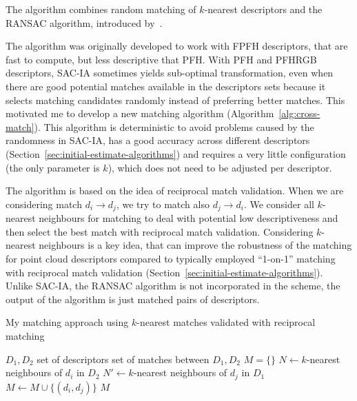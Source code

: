 The algorithm combines random matching of $k$-nearest descriptors and the \gls{RANSAC} algorithm, introduced by~\citet{fischler1981ransac}.

The algorithm was originally developed to work with \gls{FPFH} descriptors, that are fast to compute, but less descriptive that \gls{PFH}. With \gls{PFH} and \gls{PFHRGB} descriptors, \gls{SAC-IA} sometimes yields sub-optimal transformation, even when there are good potential matches available in the descriptors sets because it selects matching candidates randomly instead of preferring better matches. This motivated me to develop a new matching algorithm (Algorithm~\ref{alg:cross-match}). This algorithm is deterministic to avoid problems caused by the randomness in \gls{SAC-IA}, has a good accuracy across different descriptors (Section~\ref{sec:initial-estimate-algorithms}) and requires a very little configuration (the only parameter is $k$), which does not need to be adjusted per descriptor.

The algorithm is based on the idea of reciprocal match validation. When we are considering match $d_i \rightarrow d_j$, we try to match also $d_j \rightarrow d_i$. We consider all $k$-nearest neighbours for matching to deal with potential low descriptiveness and then select the best match with reciprocal match validation. Considering $k$-nearest neighbours is a key idea, that can improve the robustness of the matching for point cloud descriptors compared to typically employed ``1-on-1'' matching with reciprocal match validation (Section~\ref{sec:initial-estimate-algorithms}). Unlike \gls{SAC-IA}, the \gls{RANSAC} algorithm is not incorporated in the scheme, the output of the algorithm is just matched pairs of descriptors.

\begin{algorithm}
    \caption[Reciprocal $k$-nearest matching]{My matching approach using $k$-nearest matches validated with reciprocal matching}
    \label{alg:cross-match}
    \begin{algorithmic}[1]
        \Require $D_1, D_2$ set of descriptors
        \Ensure set of matches between $D_1, D_2$
            \State $M = \{\}$
                \State $N \gets k$-nearest neighbours of $d_i$ in $D_2$
                    \State $N' \gets k$-nearest neighbours of $d_j$ in $D_1$
                        \State $M \gets M \cup \{(d_i, d_j)\}$
                    \EndIf
                \EndFor
            \EndFor
            \State \Return $M$
        \EndFunction
    \end{algorithmic}
\end{algorithm}

